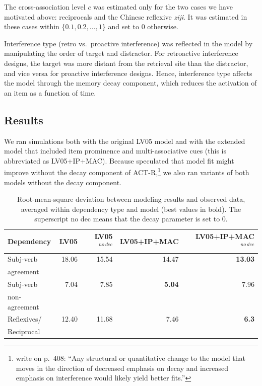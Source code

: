 \documentclass{cambridge7A}\usepackage[]{graphicx}\usepackage[]{color}
\begin{document}
The cross-association level $c$ was estimated only for the two cases we have motivated above: reciprocals and the Chinese reflexive \emph{ziji}. It was estimated in these cases within $\{0.1, 0.2, ..., 1\}$ and set to $0$ otherwise.

Interference type (retro vs.\ proactive interference) was reflected in the model by manipulating the order of target and distractor. For retroactive interference designs, the target was more distant from the retrieval site than the distractor, and vice versa for proactive interference designs. Hence, interference type affects the model through the memory decay component, which reduces the activation of an item as a function of time.

\subsection{Results}
We ran simulations both with the original LV05 model and with the extended model that included item prominence and multi-associative cues (this is abbreviated as LV05+IP+MAC).
Because \cite{LewisVasishth2005} speculated that model fit might improve without the decay component of ACT-R,\footnote{
    \cite{LewisVasishth2005} write on p.\ 408: ``Any structural or quantitative change to the model that moves in the direction of decreased emphasis on decay and increased emphasis on interference would likely yield better fits.''}
we also ran variants of both models without the decay component.



\begin{table}[!htbp]
\centering
\begin{tabular}{lrrrr}
Dependency & LV05 & LV05$^{no\ dec}$ & LV05+IP+MAC & LV05+IP+MAC$^{no\ dec}$ \\ 
\hline
Subj-verb & 18.06 & 15.54 & 14.47 & \textbf{13.03} \\ 
agreement & & & & \\
  Subj-verb & 7.04 & 7.85 & \textbf{5.04} & 7.96 \\ 
non-agreement & & & & \\
  Reflexives/ & 12.40 & 11.68 & 7.46 & \textbf{6.3} \\ 
Reciprocal & & & & \\  
\hline
\end{tabular}
\caption{Root-mean-square deviation between modeling results and observed data, averaged within dependency type and model (best values in bold). The superscript no dec means that the decay parameter is set to 0.} \label{tab:simfit}
\end{table}
\end{document}
